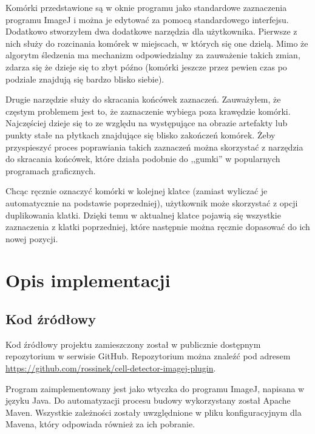 \documentclass[declaration,shortabstract,mgr]{iithesis}
\begin{document}
Komórki przedstawione są w oknie programu jako standardowe zaznaczenia programu ImageJ i można je edytować za pomocą standardowego interfejsu.
Dodatkowo stworzyłem dwa dodatkowe narzędzia dla użytkownika.
Pierwsze z nich służy do rozcinania komórek w miejscach, w których się one dzielą.
Mimo że algorytm śledzenia ma mechanizm odpowiedzialny za zauważenie takich zmian, zdarza się że dzieje się to zbyt późno (komórki jeszcze przez pewien czas po podziale znajdują się bardzo blisko siebie).

Drugie narzędzie służy do skracania końcówek zaznaczeń.
Zauważyłem, że częstym problemem jest to, że zaznaczenie wybiega poza krawędzie komórki.
Najczęściej dzieje się to ze względu na występujące na obrazie artefakty lub punkty stałe na płytkach znajdujące się blisko zakończeń komórek.
Żeby przyspieszyć proces poprawiania takich zaznaczeń można skorzystać z narzędzia do skracania końcówek, które działa podobnie do ,,gumki'' w popularnych programach graficznych.

Chcąc ręcznie oznaczyć komórki w kolejnej klatce (zamiast wyliczać je automatycznie na podstawie poprzedniej), użytkownik może skorzystać z opcji duplikowania klatki. Dzięki temu w aktualnej klatce pojawią się wszystkie zaznaczenia z klatki poprzedniej, które następnie można ręcznie dopasować do ich nowej pozycji.



\chapter{Opis implementacji}



\section{Kod źródłowy}

Kod źródłowy projektu zamieszczony został w publicznie dostępnym repozytorium w serwisie GitHub.
Repozytorium można znaleźć pod adresem
\linebreak\url{https://github.com/rossinek/cell-detector-imagej-plugin}.

Program zaimplementowany jest jako wtyczka do programu ImageJ, napisana w języku Java. Do automatyzacji procesu budowy wykorzystany został Apache Maven. Wszystkie zależności zostały uwzględnione w pliku konfiguracyjnym dla Mavena, który odpowiada również za ich pobranie.
\end{document}

